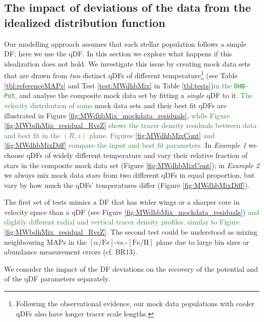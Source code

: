 \documentclass[iop,revtex4]{emulateapj}
\newcommand{\MAPs}{MAPs}
\newcommand{\NEW}[1]{\textcolor{ForestGreen}{#1}}
\newcommand{\OLD}[1]{}
\begin{document}
\subsection{The impact of deviations of the data from the idealized distribution function} \label{sec:results_mixedDFs}

Our modelling approach assumes that each stellar population follows a simple DF; here we use the qDF. In this section we explore what happens if this idealization does not hold. We investigate this issue by creating mock data sets that are drawn from \emph{two} distinct qDFs of different temperature\footnote{Following the observational evidence, our mock data populations with cooler qDFs also have longer tracer scale lengths.} (see Table \ref{tbl:referenceMAPs} and Test \ref{test:MWdhbMix} in Table \ref{tbl:tests})\NEW{in the \texttt{DHB-Pot}}, and analyse the composite mock data set by fitting a \emph{single} qDF to it. \NEW{The velocity distribution of some}\OLD{Some} mock data sets and their best fit qDFs are illustrated in Figure \ref{fig:MWdhbMix_mockdata_residuals}, \NEW{while Figure \ref{fig:MWbdhMix_residual_RvsZ} shows the tracer density residuals between data and best fit in the $(R,z)$ plane. Figures \ref{fig:MWdhbMixCont} and \ref{fig:MWdhbMixDiff} compare the input and best fit parameters.}\OLD{and the comparison of input and best fit parameters in Figures \ref{fig:MWdhbMixCont} and \ref{fig:MWdhbMixDiff}.} In \emph{Example 1} we choose qDFs of widely different temperature and vary their relative fraction of stars in the composite mock data set (Figure \ref{fig:MWdhbMixCont}); in \emph{Example 2} we always mix mock data stars from two different qDFs in equal proportion, but vary by how much the qDFs' temperatures differ (Figure \ref{fig:MWdhbMixDiff}). 

The first set of tests mimics a DF that has wider wings or a sharper core in velocity space than a qDF (see Figure \ref{fig:MWdhbMix_mockdata_residuals}) \NEW{and slightly different radial and vertical tracer density profiles, similar to Figure \ref{fig:MWbdhMix_residual_RvsZ}}. The second test could be understood as mixing neighbouring \MAPs{} in the $[\alpha/\mathrm{Fe}]$-vs.-$[\mathrm{Fe}/\mathrm{H}]$ plane due to large bin sizes or abundance measurement errors (cf. BR13). 

We consider the impact of the DF deviations on the recovery of the potential and of the qDF parameters separately. 
\end{document}
